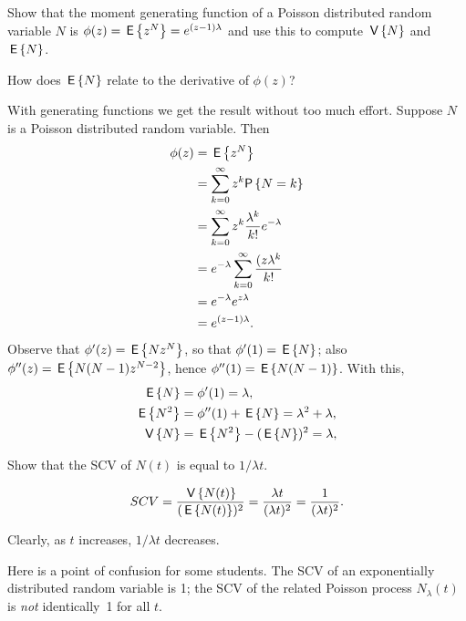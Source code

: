 \begin{exercise}
Show that the moment generating function of a Poisson distributed random variable $N$ is
$\phi(z)=  \,\mathsf{E}\left\{z^N\right\}  = e^{(z-1)\lambda}$ and use this to compute $\,\mathsf{V}\left\{N\right\}$ and $\,\mathsf{E}\left\{N\right\}$. 
\begin{hint}
  How does   $\,\mathsf{E}\left\{N\right\}$ relate to the derivative of $\phi(z)$? 
\end{hint}
\begin{solution}
With generating functions we get the result without too much
effort. Suppose $N$ is a Poisson distributed random variable. Then 
\begin{equation*}
  \begin{split}
\phi(z)
&=  \E{z^N} \\
&= \sum_{k=0}^\infty z^k \P{N=k} \\
&= \sum_{k=0}^\infty z^k \frac{\lambda^k}{k!} e^{-\lambda}  \\
&= e^{-\lambda} \sum_{k=0}^\infty  \frac{(z\lambda^k}{k!}  \\
&= e^{-\lambda} e^{z \lambda} \\
&= e^{(z-1)\lambda}.
  \end{split}
\end{equation*}
Observe that $\phi'(z) = \,\mathsf{E}\left\{N z^N\right\}$, so that $\phi'(1)=\,\mathsf{E}\left\{N\right\}$; also
$\phi''(z)=\,\mathsf{E}\left\{N(N-1)z^{N-2}\right\}$, hence $\phi''(1)=\,\mathsf{E}\left\{N(N-1)\right\}$. With this,
  \begin{align*}
    \,\mathsf{E}\left\{N\right\} &= \phi'(1)= \lambda,\\
\,\mathsf{E}\left\{N^2\right\} &= \phi''(1) + \,\mathsf{E}\left\{N\right\} = \lambda^2 + \lambda,\\
\,\mathsf{V}\left\{N\right\} &= \,\mathsf{E}\left\{N^2\right\}-(\,\mathsf{E}\left\{N\right\})^2 = \lambda,\\
  \end{align*}
\end{solution}
\end{exercise}

\begin{exercise}
Show that   the SCV of $N(t)$ is equal to $1/\lambda t$. 
  \begin{solution}
    \begin{equation*}
SCV = \frac{\,\mathsf{V}\left\{N(t)\right\}}{(\,\mathsf{E}\left\{N(t)\right\})^2} = \frac{\lambda t}{(\lambda t)^2} = \frac1{(\lambda t)^2}.
    \end{equation*}

Clearly, as $t$
increases, $1/\lambda t$ decreases.

Here is a point of confusion for some students. The SCV of an
exponentially distributed random variable is 1; the SCV of the related
Poisson process $N_\lambda(t)$ is \emph{not} identically~1 for all
$t$.
  \end{solution}
\end{exercise}


